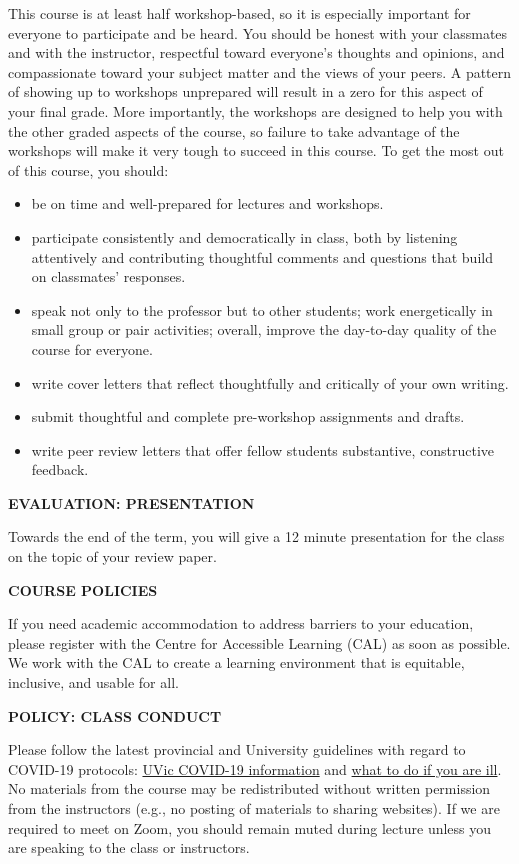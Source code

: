 \documentclass[11pt]{article}
\begin{document}
This course is at least half workshop-based, so it is especially important for everyone to participate and be heard.
You should be honest with your classmates and with the instructor, respectful toward everyone's thoughts and opinions, and compassionate toward your subject matter and the views of your peers.
A pattern of showing up to workshops unprepared will result in a zero for this aspect of your final grade.
More importantly, the workshops are designed to help you with the other graded aspects of the course, so failure to take advantage of the workshops will make it very tough to succeed in this course.
To get the most out of this course, you should:
\begin{itemize}
	\setlength\itemsep{0em}
	\item be on time and well-prepared for lectures and workshops.
	\item participate consistently and democratically in class, both by listening attentively
	      and contributing thoughtful comments and questions that build on classmates'
	      responses.
	\item speak not only to the professor but to other students; work energetically in small group or pair activities; overall, improve the day-to-day quality of the course for everyone.
	\item write cover letters that reflect thoughtfully and critically of your own writing.
	\item submit thoughtful and complete pre-workshop assignments and drafts.
	\item write peer review letters that offer fellow students substantive, constructive
	      feedback.
\end{itemize}

\textbf{EVALUATION: PRESENTATION} 

Towards the end of the term, you will give a 12 minute presentation for the class on the topic of your review paper. 

\begin{center}
  \textbf{COURSE POLICIES}
\end{center}

If you need academic accommodation to address barriers to your education, please register with the Centre for Accessible Learning (CAL) as soon as possible. We work with the CAL to create a learning environment that is equitable, inclusive, and usable for all.

\textbf{POLICY: CLASS CONDUCT}

Please follow the latest provincial and University guidelines with regard to COVID-19 protocols: \href{https://www.uvic.ca/covid19/index.php}{UVic COVID-19 information} and \href{https://www.uvic.ca/covid19/health-safety/index.php#ipn-if-you-re-sick}{what to do if you are ill}. No materials from the course may be redistributed without written permission from the instructors (e.g., no posting of materials to sharing websites). If we are required to meet on Zoom, you should remain muted during lecture unless you are speaking to the class or instructors.
\end{document}
